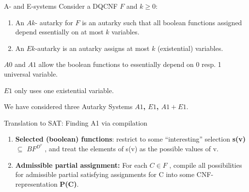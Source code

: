 \documentclass[xcolor=table	]{beamer}
\begin{document}
\begin{frame}{A- and E-systems}
Consider a DQCNF $F$ and $k \geq 0$: \newline
\begin{enumerate}
    \item An $Ak$- autarky for $F$ is an autarky such that all boolean functions assigned depend essentially on at most $k$ variables.
    \item An $Ek$-autarky is an autarky assigns at most $k$ (existential) variables. 
\end{enumerate}

\vspace{0.4cm}

  $A0$ and $A1$ allow the boolean functions to essentially \newline  
  depend on 0 resp. 1 universal variable. \newline 

  $E1$ only uses one existential variable. \newline 
  
  We have considered three Autarky Systems \newline 
  \textbf{$A1$, $E1$, $A1 + E1$}.

\end{frame}

%

\begin{frame}{Translation to SAT: Finding A1 via compilation}
\begin{enumerate}
    \item \textbf{Selected (boolean) functions}: restrict to some “interesting” selection \textbf{s(v)} $\subseteq$ $BF^{D^v}$ , and treat the elements of s(v) as the possible values of v. \newline 
    
    \item \textbf{Admissible partial assignment:} For each $C \in F$ , compile all possibilities for admissible partial satisfying assignments for C into some CNF-representation \textbf{P(C)}.
\end{enumerate}

\end{frame}
\end{document}
